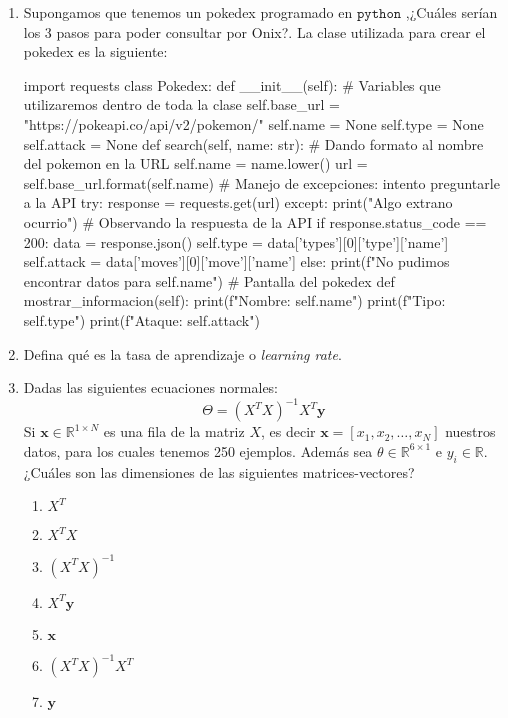 \documentclass{exam}
\theoremstyle{definition}
\begin{document}
\begin{enumerate}
\item Supongamos que tenemos un pokedex programado en $\mathtt{python}$ ,¿Cuáles serían los 3 pasos para poder consultar por Onix?. La clase utilizada para crear el pokedex es la siguiente:

    \begin{python}
import requests 
class Pokedex:
    def __init__(self):
        # Variables que utilizaremos dentro de toda la clase
        self.base_url = "https://pokeapi.co/api/v2/pokemon/{}"
        self.name = None
        self.type = None
        self.attack = None
    def search(self, name: str):
        # Dando formato al nombre del pokemon en la URL
        self.name = name.lower()
        url = self.base_url.format(self.name)
        # Manejo de excepciones: intento preguntarle a la API
        try:
            response = requests.get(url)
        except: 
            print("Algo extrano ocurrio")
        # Observando la respuesta de la API
        if response.status_code == 200:
            data = response.json()
            self.type = data['types'][0]['type']['name']
            self.attack = data['moves'][0]['move']['name']
        else:
            print(f"No pudimos encontrar datos para {self.name}")
    # Pantalla del pokedex
    def mostrar_informacion(self):
        print(f"Nombre: {self.name}")
        print(f"Tipo: {self.type}")
        print(f"Ataque: {self.attack}")     
    \end{python}

    \item Defina qué es la tasa de aprendizaje o \textit{learning rate}.
    \item Dadas las siguientes ecuaciones normales:
    \begin{equation}
      \Theta = (X^{T}X)^{-1}X^{T}\mathbf{y}
    \end{equation}
    Si $\mathbf{x} \in \mathbb{R}^{1\times N}$ es una fila de la matriz $X$, es decir $\mathbf{x}=[x_1,x_2,\dots,x_N]$ nuestros datos, para los cuales tenemos 250 ejemplos. Además sea $\theta\in \mathbb{R}^{6\times 1}$ e $y_i \in \mathbb{R}$. ¿Cuáles son las dimensiones de las siguientes matrices-vectores?
    \begin{enumerate}
        \item $X^{T}$
        \item $X^{T}X$
        \item $(X^{T}X)^{-1}$
        \item $X^{T}\mathbf{y}$
        \item $\mathbf{x}$
        \item $(X^{T}X)^{-1}X^{T}$
        \item $\mathbf{y}$
    \end{enumerate}
\end{enumerate}
\end{document}
